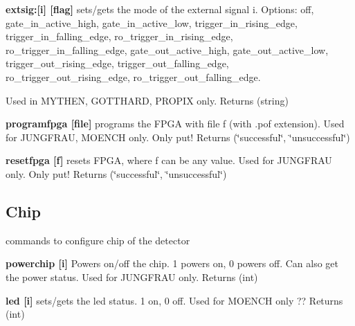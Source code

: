 \begin{DoxyItemize}
\item {\bfseries extsig:\mbox{[}i\mbox{]} \mbox{[}flag\mbox{]}} sets/gets the mode of the external signal i. Options: {\ttfamily off}, {\ttfamily gate\_\-in\_\-active\_\-high}, {\ttfamily gate\_\-in\_\-active\_\-low}, {\ttfamily trigger\_\-in\_\-rising\_\-edge}, {\ttfamily trigger\_\-in\_\-falling\_\-edge}, {\ttfamily ro\_\-trigger\_\-in\_\-rising\_\-edge}, {\ttfamily ro\_\-trigger\_\-in\_\-falling\_\-edge}, {\ttfamily gate\_\-out\_\-active\_\-high}, {\ttfamily gate\_\-out\_\-active\_\-low}, {\ttfamily trigger\_\-out\_\-rising\_\-edge}, {\ttfamily trigger\_\-out\_\-falling\_\-edge}, {\ttfamily ro\_\-trigger\_\-out\_\-rising\_\-edge}, {\ttfamily ro\_\-trigger\_\-out\_\-falling\_\-edge}. \par
 Used in MYTHEN, GOTTHARD, PROPIX only. {\ttfamily Returns} {\ttfamily }(string)
\end{DoxyItemize}


\begin{DoxyItemize}
\item {\bfseries programfpga \mbox{[}file\mbox{]}} programs the FPGA with file f (with .pof extension). Used for JUNGFRAU, MOENCH only. Only put! {\ttfamily Returns} {\ttfamily }(\char`\"{}successful\char`\"{}, \char`\"{}unsuccessful\char`\"{})
\end{DoxyItemize}


\begin{DoxyItemize}
\item {\bfseries resetfpga \mbox{[}f\mbox{]}} resets FPGA, where f can be any value. Used for JUNGFRAU only. Only put! {\ttfamily Returns} {\ttfamily }(\char`\"{}successful\char`\"{}, \char`\"{}unsuccessful\char`\"{})
\end{DoxyItemize}\hypertarget{config_configchip}{}\subsection{Chip}\label{config_configchip}
commands to configure chip of the detector


\begin{DoxyItemize}
\item {\bfseries powerchip \mbox{[}i\mbox{]}} Powers on/off the chip. 1 powers on, 0 powers off. Can also get the power status. Used for JUNGFRAU only. {\ttfamily Returns} {\ttfamily }(int)
\end{DoxyItemize}


\begin{DoxyItemize}
\item {\bfseries led \mbox{[}i\mbox{]}} sets/gets the led status. 1 on, 0 off. Used for MOENCH only ?? {\ttfamily Returns} {\ttfamily }(int)
\end{DoxyItemize}


